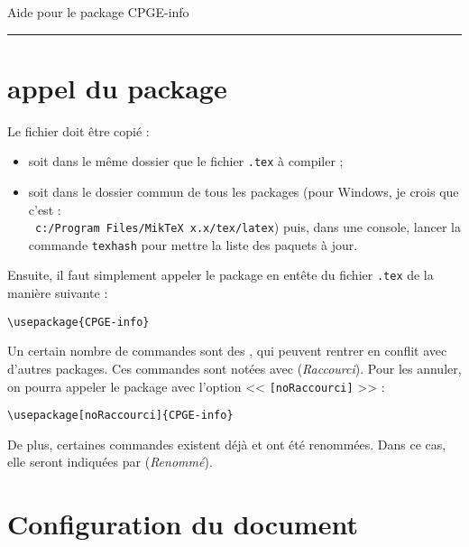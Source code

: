 \documentclass[a4paper,10pt]{article}
\newcommand{\rac}{{\color{red}(\emph{Raccourci})}}
\newcommand{\ren}{{\color{blue}(\emph{Renommé})}}
\begin{document}
	\begin{center}
		\Huge Aide pour le package CPGE-info
	\end{center}
	
	\hrule


	\section{appel du package}
	
	Le fichier doit être copié :
	\begin{itemize}
		\item soit dans le même dossier que le fichier \verb!.tex! à compiler ;
		\item soit dans le dossier commun de tous les packages (pour Windows, je crois que c'est :\\ \verb! c:/Program Files/MikTeX x.x/tex/latex!) puis,
		dans une console, lancer la commande \verb!texhash! pour mettre la liste des paquets à jour.
	\end{itemize}

	Ensuite, il faut simplement appeler le package en entête du fichier \verb!.tex! de la manière suivante :
	\begin{verbatim}
\usepackage{CPGE-info}
	\end{verbatim}
	
	Un certain nombre de commandes sont des , qui peuvent rentrer en conflit avec d'autres packages.
	Ces commandes sont notées avec \rac.
	Pour les annuler, on pourra appeler le package avec l'option << \verb![noRaccourci]! >> :
	\begin{verbatim}
\usepackage[noRaccourci]{CPGE-info}
	\end{verbatim}
	
	De plus, certaines commandes existent déjà et ont été renommées. Dans ce cas, elle seront indiquées par \ren.

	\section{Configuration du document}
\end{document}
